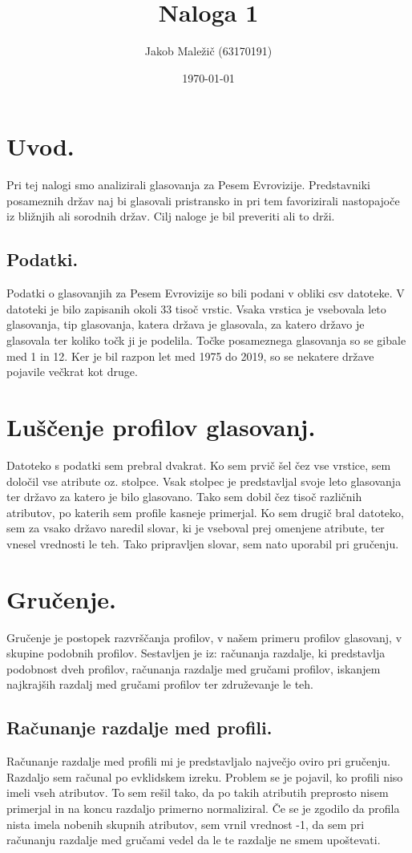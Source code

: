 \documentclass[a4paper,11pt]{article}
\title{Naloga 1}
\author{Jakob Maležič (63170191)}
\date{\today}
\begin{document}
\maketitle

\section{Uvod.}
Pri tej nalogi smo analizirali glasovanja za Pesem Evrovizije. Predstavniki posameznih držav naj bi glasovali pristransko in pri tem favorizirali nastopajoče iz bližnjih ali sorodnih držav. Cilj naloge je bil preveriti ali to drži.

\subsection{Podatki.}
Podatki o glasovanjih za Pesem Evrovizije so bili podani v obliki csv datoteke. V datoteki je bilo zapisanih okoli 33 tisoč vrstic. Vsaka vrstica je vsebovala leto glasovanja, tip glasovanja, katera država je glasovala, za katero državo je glasovala ter koliko točk ji je podelila. Točke posameznega glasovanja so se gibale med 1 in 12. Ker je bil razpon let med 1975 do 2019, so se nekatere države pojavile večkrat kot druge.

\section{Luščenje profilov glasovanj.}
Datoteko s podatki sem prebral dvakrat. Ko sem prvič šel čez vse vrstice, sem določil vse atribute oz. stolpce. Vsak stolpec je predstavljal svoje leto glasovanja ter državo za katero je bilo glasovano. Tako sem dobil čez tisoč različnih atributov, po katerih sem profile kasneje primerjal. Ko sem drugič bral datoteko, sem za vsako državo naredil slovar, ki je vseboval prej omenjene atribute, ter vnesel vrednosti le teh. Tako pripravljen slovar, sem nato uporabil pri gručenju.

\section{Gručenje.}
Gručenje je postopek razvrščanja profilov, v našem primeru profilov glasovanj, v skupine podobnih profilov. Sestavljen je iz: računanja razdalje, ki predstavlja podobnost dveh profilov, računanja razdalje med gručami profilov, iskanjem najkrajših razdalj med gručami profilov ter združevanje le teh.

\subsection{Računanje razdalje med profili.}
Računanje razdalje med profili mi je predstavljalo največjo oviro pri gručenju. Razdaljo sem računal po evklidskem izreku. Problem se je pojavil, ko profili niso imeli vseh atributov. To sem rešil tako, da po takih atributih preprosto nisem primerjal in na koncu razdaljo primerno normaliziral. Če se je zgodilo da profila nista imela nobenih skupnih atributov, sem vrnil vrednost -1, da sem pri računanju razdalje med gručami vedel da le te razdalje ne smem upoštevati.
\end{document}
